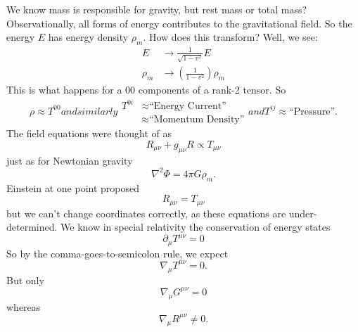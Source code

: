 We know mass is responsible for gravity, but rest mass or total
mass? Observationally, all forms of energy contributes to the
gravitational field. So the energy $E$ has energy density
$\rho_{m}$. How does this transform? Well, we see:
\begin{equation}
\begin{split}
E&\to\frac{1}{\sqrt{1-v^{2}}}E\\
\rho_{m}&\to\left(\frac{1}{1-v^{2}}\right)\rho_{m}
\end{split}
\end{equation}
This is what happens for a $00$ components of a rank-2 tensor. So
\begin{subequations}
\begin{equation}
\rho\approx T^{00}
\end{equation}
and similarly
\begin{equation}
\begin{split}
T^{0i}&\approx\mbox{``Energy Current''}\\
&\approx\mbox{``Momentum Density''}
\end{split}
\end{equation}
and
\begin{equation}
T^{ij}\approx\mbox{``Pressure''}.
\end{equation}
\end{subequations}
The field equations were thought of as
\begin{equation}
R_{\mu\nu}+g_{\mu\nu}R\propto T_{\mu\nu}
\end{equation}
just as for Newtonian gravity
\begin{equation}
\nabla^{2}\Phi=4\pi G\rho_{m}.
\end{equation}
Einstein at one point proposed
\begin{equation}
R_{\mu\nu}=T_{\mu\nu}
\end{equation}
but we can't change coordinates correctly, as these equations are
under-determined. We know in special relativity the conservation
of energy states
\begin{equation}
\partial_{\mu}T^{\mu\nu}=0
\end{equation}
So by the comma-goes-to-semicolon rule, we expect
\begin{equation}
\nabla_{\mu}T^{\mu\nu}=0.
\end{equation}
But only
\begin{equation}
\nabla_{\mu}G^{\mu\nu}=0
\end{equation}
whereas
\begin{equation}
\nabla_{\mu}R^{\mu\nu}\not=0.
\end{equation}

